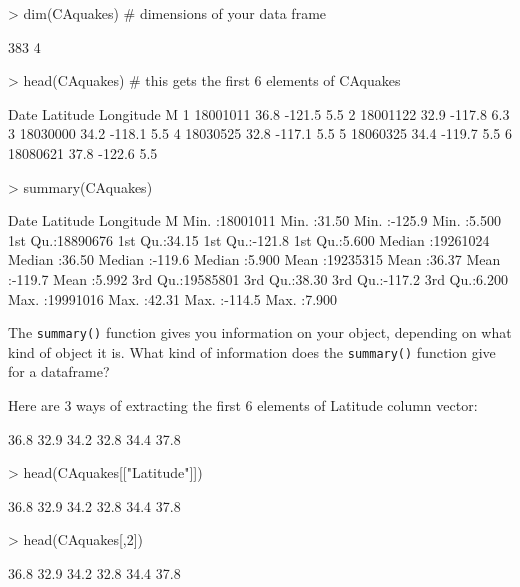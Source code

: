\documentclass[answers]{exam}
\begin{document}
\begin{Schunk}
\begin{Sinput}
> dim(CAquakes) # dimensions of your data frame
\end{Sinput}
\begin{Soutput}
[1] 383   4
\end{Soutput}
\begin{Sinput}
> head(CAquakes)  # this gets the first 6 elements of CAquakes
\end{Sinput}
\begin{Soutput}
      Date Latitude Longitude   M
1 18001011     36.8    -121.5 5.5
2 18001122     32.9    -117.8 6.3
3 18030000     34.2    -118.1 5.5
4 18030525     32.8    -117.1 5.5
5 18060325     34.4    -119.7 5.5
6 18080621     37.8    -122.6 5.5
\end{Soutput}
\begin{Sinput}
> summary(CAquakes)  
\end{Sinput}
\begin{Soutput}
      Date             Latitude       Longitude            M        
 Min.   :18001011   Min.   :31.50   Min.   :-125.9   Min.   :5.500  
 1st Qu.:18890676   1st Qu.:34.15   1st Qu.:-121.8   1st Qu.:5.600  
 Median :19261024   Median :36.50   Median :-119.6   Median :5.900  
 Mean   :19235315   Mean   :36.37   Mean   :-119.7   Mean   :5.992  
 3rd Qu.:19585801   3rd Qu.:38.30   3rd Qu.:-117.2   3rd Qu.:6.200  
 Max.   :19991016   Max.   :42.31   Max.   :-114.5   Max.   :7.900  
\end{Soutput}
\end{Schunk}
\noindent The \texttt{summary()} function gives you information on your object, depending on what kind of object it is. What kind of information does the \texttt{summary()} function give for a dataframe?

\noindent Here are 3 ways of extracting the first 6 elements of Latitude column vector:
\begin{Schunk}
\begin{Soutput}
[1] 36.8 32.9 34.2 32.8 34.4 37.8
\end{Soutput}
\begin{Sinput}
> head(CAquakes[["Latitude"]])
\end{Sinput}
\begin{Soutput}
[1] 36.8 32.9 34.2 32.8 34.4 37.8
\end{Soutput}
\begin{Sinput}
> head(CAquakes[,2])
\end{Sinput}
\begin{Soutput}
[1] 36.8 32.9 34.2 32.8 34.4 37.8
\end{Soutput}
\end{Schunk}
\end{document}
